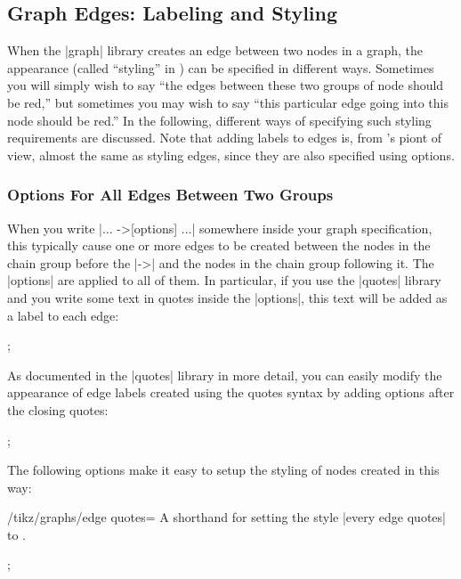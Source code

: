 \subsection{Graph Edges: Labeling and Styling}

When the |graph| library creates an edge between two nodes in a graph,
the appearance (called ``styling'' in \tikzname) can be specified in
different ways. Sometimes you will simply wish to say ``the edges
between these two groups of node should be red,'' but sometimes you
may wish to say ``this particular edge going into this node should be
red.'' In the following, different ways of specifying such styling
requirements are discussed. Note that adding labels to edges is, from
\tikzname's piont of view, almost the same as styling edges, since
they are also specified using options.


\subsubsection{Options For All Edges Between Two Groups}

When you write |... ->[options] ...| somewhere inside your graph
specification, this typically cause one or more edges to be created
between the nodes in the chain group before the |->| and the nodes in
the chain group following it. The |options| are applied to all of
them. In particular, if you use the |quotes| library and you write
some text in quotes inside the |options|, this text will be added as a
label to each edge:

\begin{codeexample}[]
\tikz 
  ;
\end{codeexample}

As documented in the |quotes| library in more detail, you can easily
modify the appearance of edge labels created using the quotes syntax
by adding options after the closing quotes:

\begin{codeexample}[]
\tikz {};
\end{codeexample}

The following options make it easy to setup the styling of nodes
created in this way:

\begin{key}{/tikz/graphs/edge quotes=}
  A shorthand for setting the style |every edge quotes| to .  
\begin{codeexample}[]
  \tikz {};
\end{codeexample}
\end{key}

